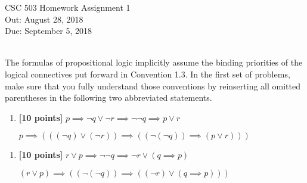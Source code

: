 \documentclass{article}
\begin{document}
\begin{center}
  {\LARGE CSC 503 Homework Assignment 1}\\[1pc]
  Out: August 28, 2018 \\
  Due: September 5, 2018 \\
   \\
\end{center}

\noindent
The formulas of propositional logic implicitly assume the binding
priorities of the logical connectives put forward in Convention 1.3.
In the first set of problems, make sure that you fully understand
those conventions by reinserting all omitted parentheses in the
following two abbreviated statements.

\begin{enumerate}
\item[1.] \textbf{[10 points]}
  $p \implies \neg q \lor \neg r \implies \neg \neg q \implies p \lor r$ 
    
    \begin{answer}
    $p \implies (((\neg q) \lor (\neg r)) \implies ((\neg (\neg q)) \implies (p \lor r)))$
    \end{answer}
    
\end{enumerate}

\begin{enumerate}
\item[2.] \textbf{[10 points]}
  $r \lor p \implies \neg \neg q \implies \neg r \lor (q \implies p)$
   
   \begin{answer}
   $(r \lor p) \implies ((\neg (\neg q)) \implies ((\neg r) \lor (q \implies p)))$
   \end{answer}
   
\end{enumerate}
\end{document}
